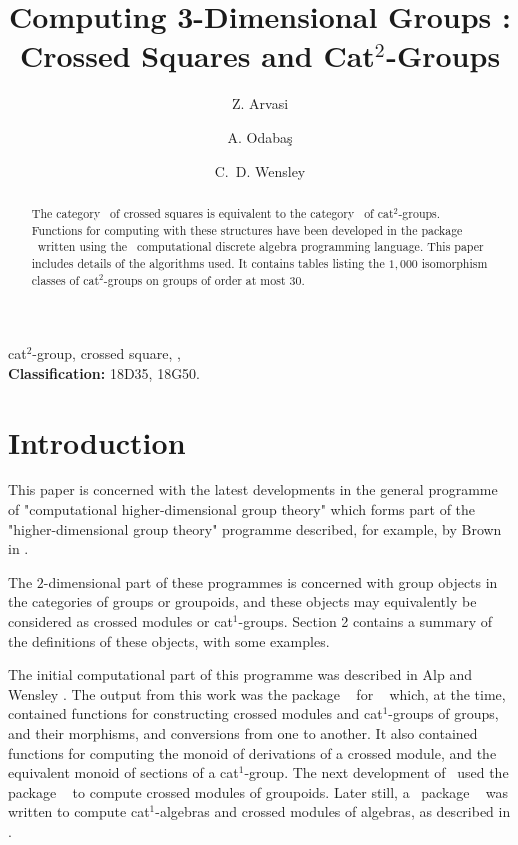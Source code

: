 \documentclass[a4paper,11pt]{article}
\theoremstyle{plain}
\theoremstyle{definition}
\begin{document}
\title{Computing 3-Dimensional Groups : Crossed Squares and  Cat$^2$-Groups}

\author[a]{Z. Arvasi}
\author[a]{A. Odaba\c{s}}
\author[b]{C.~D. Wensley}

\date{}

\maketitle

\begin{abstract}
The category \catXSq\ of crossed squares is equivalent to 
the category \catCatt\ of cat$^2$-groups. 
Functions for computing with these structures have been developed in 
the package \XMod\ written using the \GAP\ computational discrete algebra 
programming language.
This paper includes details of the algorithms used. 
It contains tables listing the $1,000$ isomorphism classes of cat$^2$-groups on groups of order at most $30$. 


\end{abstract}

 cat$^2$-group, crossed square, \GAP, \XMod\ 
\\ {\bf Classification:} 18D35, 18G50.

\section{Introduction}

This paper is concerned with the latest developments in the general programme 
of "computational higher-dimensional group theory" which forms part of the 
"higher-dimensional group theory" programme described, for example, 
by Brown in \cite{brown-lms}. 

The $2$-dimensional part of these programmes is concerned with group objects 
in the categories of groups or groupoids, and these objects may equivalently 
be considered as crossed modules or cat$^1$-groups. 
Section 2 contains a summary of the definitions of these objects, 
with some examples. 

The initial computational part of this programme was described in 
Alp and Wensley \cite{alp-wensley-ijac}. 
The output from this work was the package \XMod\ \cite{xmod} 
for \GAP\ \cite{gap} which, at the time, 
contained functions for constructing crossed modules and cat$^1$-groups of groups, and their morphisms, and conversions from one to another. 
It also contained functions for computing the monoid of derivations of a 
crossed module, and the equivalent monoid of sections of a cat$^1$-group. 
The next development of \XMod\ used the package \groupoids\ 
\cite{groupoids} to compute crossed modules of groupoids. 
Later still, a \GAP\ package \XModAlg\ \cite{xmodalg} 
was written to compute cat$^1$-algebras and crossed modules of algebras, 
as described in \cite{arvasi-odabas}. 
\end{document}
